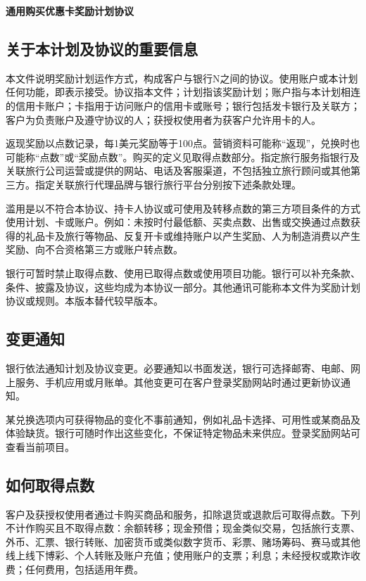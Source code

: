 \documentclass[UTF8,fontset=none,11pt,a4paper]{ctexart}
\begin{document}
{\noindent\fontsize{20}{25}\selectfont\bfseries 通用购买优惠卡奖励计划协议\par}
\vspace{10pt}
\subsection*{关于本计划及协议的重要信息}
本文件说明奖励计划运作方式，构成客户与银行N之间的协议。使用账户或本计划任何功能，即表示接受。协议指本文件；计划指该奖励计划；账户指与本计划相连的信用卡账户；卡指用于访问账户的信用卡或账号；银行包括发卡银行及关联方；客户为负责账户及遵守协议的人；获授权使用者为获客户允许用卡的人。


返现奖励以点数记录，每1美元奖励等于100点。营销资料可能称“返现”，兑换时也可能称“点数”或“奖励点数”。购买的定义见取得点数部分。指定旅行服务指银行及关联旅行公司运营或提供的网站、电话及客服渠道，不包括独立旅行顾问或其他第三方。指定关联旅行代理品牌与银行旅行平台分别按下述条款处理。


滥用是以不符合本协议、持卡人协议或可使用及转移点数的第三方项目条件的方式使用计划、卡或账户。例如：未按时付最低额、买卖点数、出售或交换通过点数获得的礼品卡及旅行等物品、反复开卡或维持账户以产生奖励、人为制造消费以产生奖励、向不合资格第三方或账户转点数。


银行可暂时禁止取得点数、使用已取得点数或使用项目功能。银行可以补充条款、条件、披露及协议，这些均成为本协议一部分。其他通讯可能称本文件为奖励计划协议或规则。本版本替代较早版本。


\subsection*{变更通知}
银行依法通知计划及协议变更。必要通知以书面发送，银行可选择邮寄、电邮、网上服务、手机应用或月账单。其他变更可在客户登录奖励网站时通过更新协议通知。


某兑换选项内可获得物品的变化不事前通知，例如礼品卡选择、可用性或某商品及体验缺货。银行可随时作出这些变化，不保证特定物品未来供应。登录奖励网站可查看当前项目。


\subsection*{如何取得点数}
客户及获授权使用者通过卡购买商品和服务，扣除退货或退款后可取得点数。下列不计作购买且不取得点数：余额转移；现金预借；现金类似交易，包括旅行支票、外币、汇票、银行转账、加密货币或类似数字货币、彩票、赌场筹码、赛马或其他线上线下博彩、个人转账及账户充值；使用账户的支票；利息；未经授权或欺诈收费；任何费用，包括适用年费。
\end{document}
